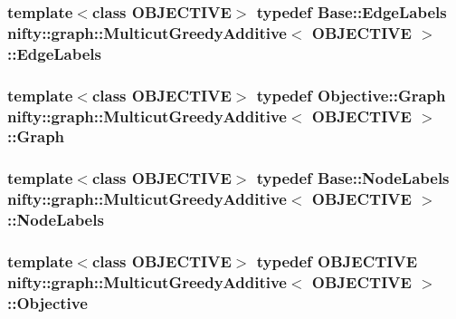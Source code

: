 \subsubsection[{Edge\+Labels}]{\setlength{\rightskip}{0pt plus 5cm}template$<$class O\+B\+J\+E\+C\+T\+I\+V\+E$>$ typedef {\bf Base\+::\+Edge\+Labels} {\bf nifty\+::graph\+::\+Multicut\+Greedy\+Additive}$<$ O\+B\+J\+E\+C\+T\+I\+V\+E $>$\+::{\bf Edge\+Labels}}\label{classnifty_1_1graph_1_1MulticutGreedyAdditive_a55aa2b8b11b45f02ea0e5c8874a39533}
\hypertarget{classnifty_1_1graph_1_1MulticutGreedyAdditive_ad473f03139a027ca293bb31cad4c4687}{}
\subsubsection[{Graph}]{\setlength{\rightskip}{0pt plus 5cm}template$<$class O\+B\+J\+E\+C\+T\+I\+V\+E$>$ typedef Objective\+::\+Graph {\bf nifty\+::graph\+::\+Multicut\+Greedy\+Additive}$<$ O\+B\+J\+E\+C\+T\+I\+V\+E $>$\+::{\bf Graph}}\label{classnifty_1_1graph_1_1MulticutGreedyAdditive_ad473f03139a027ca293bb31cad4c4687}
\hypertarget{classnifty_1_1graph_1_1MulticutGreedyAdditive_a7e666246f7000022acfb2dd91474afed}{}
\subsubsection[{Node\+Labels}]{\setlength{\rightskip}{0pt plus 5cm}template$<$class O\+B\+J\+E\+C\+T\+I\+V\+E$>$ typedef {\bf Base\+::\+Node\+Labels} {\bf nifty\+::graph\+::\+Multicut\+Greedy\+Additive}$<$ O\+B\+J\+E\+C\+T\+I\+V\+E $>$\+::{\bf Node\+Labels}}\label{classnifty_1_1graph_1_1MulticutGreedyAdditive_a7e666246f7000022acfb2dd91474afed}
\hypertarget{classnifty_1_1graph_1_1MulticutGreedyAdditive_a46ff3cae81673292ace3d4d4dd6f3011}{}
\subsubsection[{Objective}]{\setlength{\rightskip}{0pt plus 5cm}template$<$class O\+B\+J\+E\+C\+T\+I\+V\+E$>$ typedef O\+B\+J\+E\+C\+T\+I\+V\+E {\bf nifty\+::graph\+::\+Multicut\+Greedy\+Additive}$<$ O\+B\+J\+E\+C\+T\+I\+V\+E $>$\+::{\bf Objective}}\label{classnifty_1_1graph_1_1MulticutGreedyAdditive_a46ff3cae81673292ace3d4d4dd6f3011}
\hypertarget{classnifty_1_1graph_1_1MulticutGreedyAdditive_ab14192647e24d574c75538087acfd090}{}
